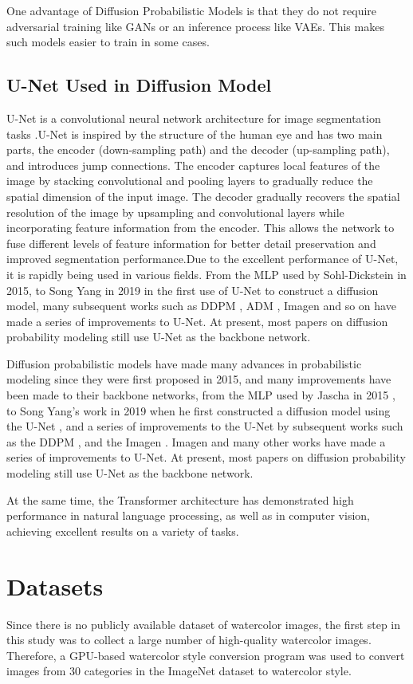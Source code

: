 \documentclass{acsman}
\begin{document}
One advantage of Diffusion Probabilistic Models is that they do not require adversarial training like GANs or an inference process like VAEs. This makes such models easier to train in some cases.
\subsection{U-Net Used in Diffusion Model}
U-Net is a convolutional neural network architecture for image segmentation tasks \cite{ronneberger2015u}.U-Net is inspired by the structure of the human eye and has two main parts, the encoder (down-sampling path) and the decoder (up-sampling path), and introduces jump connections. The encoder captures local features of the image by stacking convolutional and pooling layers to gradually reduce the spatial dimension of the input image. The decoder gradually recovers the spatial resolution of the image by upsampling and convolutional layers while incorporating feature information from the encoder. This allows the network to fuse different levels of feature information for better detail preservation and improved segmentation performance.Due to the excellent performance of U-Net, it is rapidly being used in various fields.
From the MLP used by Sohl-Dickstein in 2015, to Song Yang in 2019 in the first use of U-Net to construct a diffusion model, many subsequent works such as DDPM , ADM , Imagen and so on have made a series of improvements to U-Net. At present, most papers on diffusion probability modeling still use U-Net as the backbone network.

Diffusion probabilistic models have made many advances in probabilistic modeling since they were first proposed in 2015, and many improvements have been made to their backbone networks, from the MLP used by Jascha in 2015 \cite{sohl2015deep}, to Song Yang's work in 2019 when he first constructed a diffusion model using the U-Net \cite{song2019generative}, and a series of improvements to the U-Net by subsequent works such as the DDPM \cite{ho2020denoising}, and the Imagen \cite{saharia2022photorealistic}. Imagen and many other works have made a series of improvements to U-Net. At present, most papers on diffusion probability modeling still use U-Net as the backbone network.

At the same time, the Transformer architecture has demonstrated high performance in natural language processing, as well as in computer vision, achieving excellent results on a variety of tasks.
\section{Datasets}\label{sec:dataset}
Since there is no publicly available dataset of watercolor images, the first step in this study was to collect a large number of high-quality watercolor images. Therefore, a GPU-based watercolor style conversion program was used to convert images from 30 categories in the ImageNet dataset to watercolor style.
\end{document}
